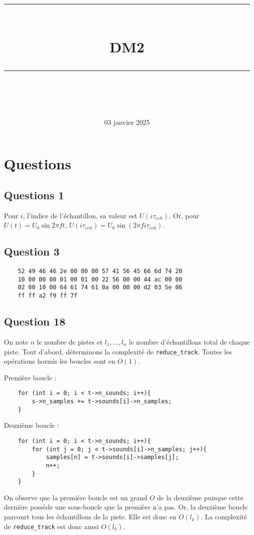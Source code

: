 \documentclass[11pt]{article} %
\title{
    \vspace{10pt} %
    \rule{\linewidth}{1pt}\\ %
    \vspace{10pt} %
    {\huge DM2}\\ %
    \rule{\linewidth}{1pt}\\ %
    \vspace{5pt} %
}
\date{\normalsize{03 janvier 2025}} %
\begin{document}
\maketitle %
\thispagestyle{empty}
\section{Questions}
\subsection*{Questions 1}
Pour $i$, l'indice de l'échantillon, sa valeur est $U(i\tau_{ech})$. Or, pour $U(t) = U_0\sin 2\pi ft$, $U(i\tau_{ech}) = U_0\sin (2\pi fi\tau_{ech})$.

\subsection*{Question 3}
\begin{lstlisting}
    52 49 46 46 2e 00 00 00 57 41 56 45 66 6d 74 20
    10 00 00 00 01 00 01 00 22 56 00 00 44 ac 00 00
    02 00 10 00 64 61 74 61 0a 00 00 00 d2 03 5e 06
    ff ff a2 f9 ff 7f 
\end{lstlisting}

\subsection*{Question 18}
On note $n$ le nombre de pistes et $l_1, \ldots, l_n$ le nombre d'échantillons total de chaque piste.
Tout d'abord, déterminons la complexité de \texttt{reduce\_track}.
Toutes les opérations hormis les boucles sont en $O(1)$.

Première boucle :

\begin{lstlisting}
    for (int i = 0; i < t->n_sounds; i++){
        s->n_samples += t->sounds[i]->n_samples;
    }
\end{lstlisting}

Deuxième boucle :

\begin{lstlisting}
    for (int i = 0; i < t->n_sounds; i++){
        for (int j = 0; j < t->sounds[i]->n_samples; j++){
            samples[n] = t->sounds[i]->samples[j];
            n++;
        }
    }
\end{lstlisting}

On observe que la première boucle est un grand $O$ de la deuxième puisque cette dernière possède une sous-boucle que la première n'a pas. Or, la deuxième boucle parcourt tous les échantillons de la piste. Elle est donc en $O(l_k)$.
La complexité de \texttt{reduce\_track} est donc aussi $O(l_k)$.
\end{document}
